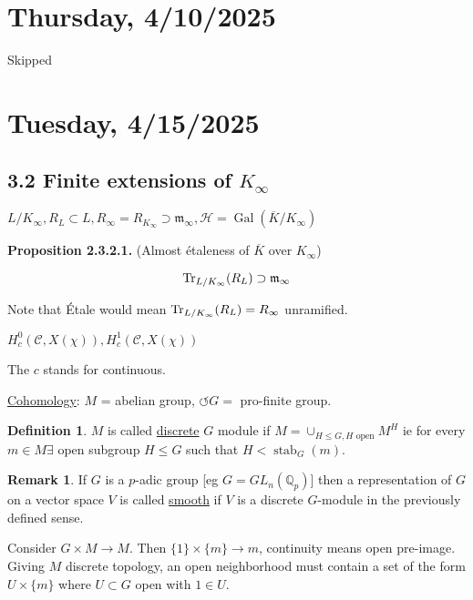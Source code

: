 \documentclass{article}
\theoremstyle{definition}
\newtheorem*{definition}{Definition}
\numberwithin{theorem}{subsection}
\newtheorem*{remark}{Remark}
\begin{document}
    \section*{Thursday, 4/10/2025}
    
    Skipped

    \section*{Tuesday, 4/15/2025}
    
    \subsection*{3.2 Finite extensions of \(K_\infty\)}

    \(L / K_\infty, R_L \subset L, R_\infty = R_{K_\infty} \supset \mathfrak{m}_\infty , \mathscr{H} = \operatorname{Gal}(\overline{K} / K_\infty)\)
    
    \textbf{Proposition 2.3.2.1.} (Almost \'etaleness of \(\overline{K}\) over \(K_\infty\))

    \[
        \Tr_{L / K_\infty} (R_L) \supset \mathfrak{m}_\infty
    \]

    Note that \'Etale would mean \(\Tr_{L / K_\infty}(R_L) = R_\infty\) unramified.
    
    \(H_c^0(\mathscr{C}, X(\chi)), H^1_c(\mathscr{C}, X(\chi))\)

    The \(c\) stands for continuous.

    \underline{Cohomology}: \(M\) = abelian group, \(\circlearrowleft G =\) pro-finite group.
    
    \begin{definition}
        \(M\) is called \underline{discrete} \(G\) module if \(M = \cup_{H \leq G, H \text{ open}} M^H\) ie for every \(m\in M \exists\) open subgroup \(H \leq G\) such that \(H < \operatorname{stab}_G(m)\).
    \end{definition}

    \begin{remark}
        If \(G\) is a \(p\)-adic group [eg \(G = GL_n(\mathbb{Q}_p)\)] then a representation of \(G\) on a vector space \(V\) is called \underline{smooth} if \(V\) is a discrete \(G\)-module in the previously defined sense.
    \end{remark}

    Consider \(G \times M \to M\). Then \(\{ 1 \} \times \{ m \} \to m\), continuity means open pre-image. Giving \(M\) discrete topology, an open neighborhood must contain a set of the form \(U \times \{ m \}\) where \(U \subset G\) open with \(1\in U\).
\end{document}
